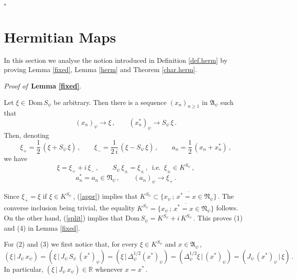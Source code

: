 \documentclass[reqno]{amsart}
\theoremstyle{definition}
\theoremstyle{remark}
\numberwithin{equation}{section}
\theoremstyle{plain}
\begin{document}
\hfill $\square\quad$

\bigskip
\section{Hermitian Maps}
\bigskip

In this section we analyse the notion introduced in Definition
\ref{def.herm} by proving Lemma \ref{fixed}, Lemma \ref{herm} and
Theorem \ref{char.herm}.
\medskip

{\it Proof of }$\,${\bf Lemma \ref{fixed}}.
\medskip

Let $\xi\in\,$Dom$\, S_\psi$ be arbitrary. Then there is a 
sequence $(x_n)_{n\geq 1}$ in $\mathfrak A_\psi$ such that
\begin{equation*}
(x_n^{})_\psi\longrightarrow\xi\, ,\qquad (x_n^*)_\psi\longrightarrow
S_\psi\,\xi\, .
\end{equation*}
Then, denoting
\begin{equation*}
\xi_+ =\frac 12\, (\xi +S_\psi\,\xi )\, ,\qquad \xi_- =\frac 1{2\, i}\,
(\xi -S_\psi\,\xi )\, ,\qquad a_n =\frac 12\, (x_n^{} +x_n^*)\, ,
\end{equation*}
we have
\begin{equation}\label{split}
\xi =\xi_+ +i\,\xi_-\, ,\qquad S_\psi\,\xi_\pm =\xi_\pm\, ,\,
\text{ i.e. }\,\xi_\pm\in K^{S_\psi}\, ,
\end{equation}
\begin{equation}\label{appr}
a_n^*=a_n^{}\in\mathfrak N_\psi\, ,\qquad (a_n^{})_\psi\longrightarrow
\xi_+\, .
\end{equation}
\vspace{0.1 pt}

Since $\xi_+=\xi$ if $\xi\in K^{S_\psi}\,$, (\ref{appr}) implies that
$K^{S_\psi}\subset\overline{\{ x_\psi\, ;\, x^*=x\in
\mathfrak N_\psi\}}\,$. The converse inclusion being trivial, the
equality $K^{S_\psi} =\overline{\{ x_\psi\, ;\, x^*=x\in
\mathfrak N_\psi\}}$ follows. On the other hand, (\ref{split})
implies that Dom$\, S_\psi =K^{S_\psi} +i\, K^{S_\psi}\,$. This
proves (1) and (4) in Lemma \ref{fixed}.

For (2) and (3) we first notice that, for every $\xi\in K^{S_\psi}$
and $x\in\mathfrak A_\psi\,$,
\begin{equation*}
(\xi\, |\, J_\psi\, x_\psi )=(\xi\, |\, J_\psi\, S_\psi\, (x^*)_\psi )
=(\xi\, |\,\Delta_\psi^{1/2} (x^*)_\psi )=(\Delta_\psi^{1/2} \xi\, |\,
(x^*)_\psi )=(J_\psi\, (x^*)_\psi\, |\,\xi )\, .
\end{equation*}
In particular, $(\xi\, |\, J_\psi\, x_\psi )\in\mathbb R$ whenever
$x=x^*\,$.
\end{document}
